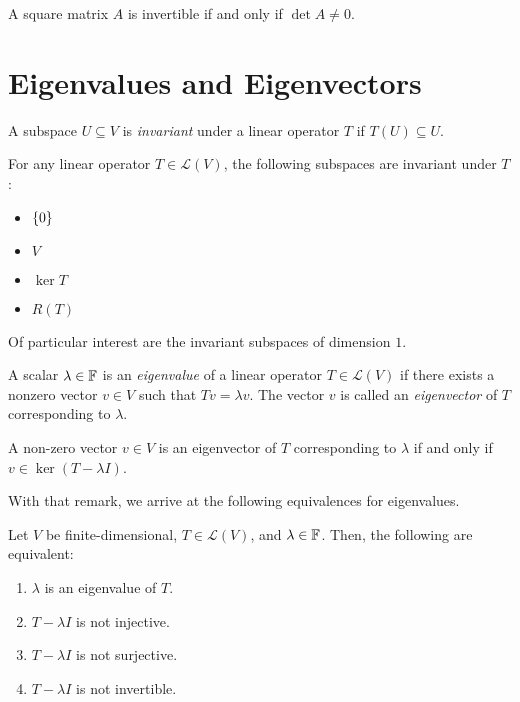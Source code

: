 \documentclass{article}
\begin{document}
\begin{theorem}
  A square matrix $A$ is invertible if and only if $\det A \neq 0$.
\end{theorem}

\section{Eigenvalues and Eigenvectors}

\begin{definition}
  A subspace $U \subseteq V$ is \emph{invariant} under a linear operator $T$ if $T(U) \subseteq U$.
\end{definition}

\begin{example}
  For any linear operator $T \in \mathcal{L}(V)$, the following subspaces are invariant under $T$:
  \begin{itemize}
    \item $\{0\}$
    \item $V$
    \item $\ker T$
    \item $R(T)$
  \end{itemize}
\end{example}

Of particular interest are the invariant subspaces of dimension $1$.

\begin{definition}
  A scalar $\lambda \in \mathbb{F}$ is an \emph{eigenvalue} of a linear operator $T \in \mathcal{L}(V)$ if there exists a nonzero vector $v \in V$ such that $Tv = \lambda v$.
  The vector $v$ is called an \emph{eigenvector} of $T$ corresponding to $\lambda$.
\end{definition}

\begin{remark}
  A non-zero vector $v \in V$ is an eigenvector of $T$ corresponding to $\lambda$ if and only if $v \in \ker (T - \lambda I)$.
\end{remark}

With that remark, we arrive at the following equivalences for eigenvalues.

\begin{theorem}
  Let $V$ be finite-dimensional, $T \in \mathcal{L}(V)$, and $\lambda \in \mathbb{F}$.
  Then, the following are equivalent:
  \begin{enumerate}
    \item $\lambda$ is an eigenvalue of $T$.
    \item $T - \lambda I$ is not injective.
    \item $T - \lambda I$ is not surjective.
    \item $T - \lambda I$ is not invertible.
  \end{enumerate}
\end{theorem}
\end{document}
